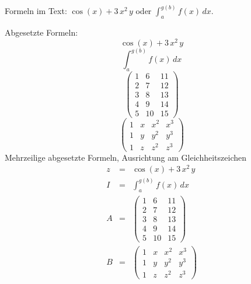 \documentclass[12pt]{article}
\begin{document}
Formeln im Text: $\cos\!\left(x\right) + 3\, x^2\, y$
oder $	\int_a^{g(b)} f(x) \, dx$.

Abgesetzte Formeln:
$$
\cos\!\left(x\right) + 3\, x^2\, y
$$
\[
	\int_a^{g(b)} f(x) \, dx
\]
\[
\left(\begin{array}{ccc} 1 & 6 & 11\\ 2 & 7 & 12\\ 3 & 8 & 13\\ 4 & 9 & 14\\ 5 & 10 & 15 \end{array}\right)
\]
\[
\left(\begin{array}{cccc} 1 & x & x^2 & x^3\\ 1 & y & y^2 & y^3\\ 1 & z & z^2 & z^3 \end{array}\right)
\]
Mehrzeilige abgesetzte Formeln, Ausrichtung am Gleichheitszeichen
\begin{eqnarray}
z &=& \cos\!\left(x\right) + 3\, x^2\, y
\\
I &=& \int_a^{g(b)} f(x) \, dx
\\
A &=& \left(\begin{array}{ccc} 1 & 6 & 11\\ 2 & 7 & 12\\ 3 & 8 & 13\\ 4 & 9 & 14\\ 5 & 10 & 15 \end{array}\right)
\\
B &=& \left(\begin{array}{cccc} 1 & x & x^2 & x^3\\ 1 & y & y^2 & y^3\\ 1 & z & z^2 & z^3 \end{array}\right)
\end{eqnarray}
\end{document}
